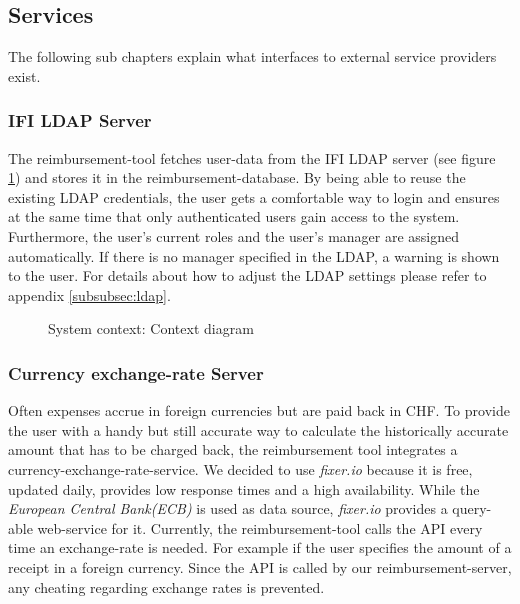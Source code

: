 \subsection{Services}
The following sub chapters explain what interfaces to external service providers exist.

\subsubsection{IFI LDAP Server}
The reimbursement-tool fetches user-data from the IFI LDAP server (see figure \ref{fig:context-diagram}) and stores it in the reimbursement-database. By being able to reuse the existing LDAP credentials, the user gets a comfortable way to login and ensures at the same time that only authenticated users gain access to the system. Furthermore, the user's current roles and the user's manager are assigned automatically. If there is no manager specified in the LDAP, a warning is shown to the user. For details about how to adjust the LDAP settings please refer to appendix \ref{subsubsec:ldap}.

\begin{figure}[H]
	\centering
	\caption{System context: Context diagram}
	\label{fig:context-diagram}
\end{figure}

\subsubsection{Currency exchange-rate Server}
Often expenses accrue in foreign currencies but are paid back in CHF. To provide the user with a handy but still accurate way to calculate the historically accurate amount that has to be charged back, the reimbursement tool integrates a currency-exchange-rate-service. We decided to use \textit{fixer.io} \cite{fixer} because it is free, updated daily, provides low response times and a high availability. While the \textit{European Central Bank(ECB)}\cite{ecb} is used as data source, \textit{fixer.io} provides a query-able web-service for it. Currently, the reimbursement-tool calls the API every time an exchange-rate is needed. For example if the user specifies the amount of a receipt in a foreign currency. Since the API is called by our reimbursement-server, any cheating regarding exchange rates is prevented.

